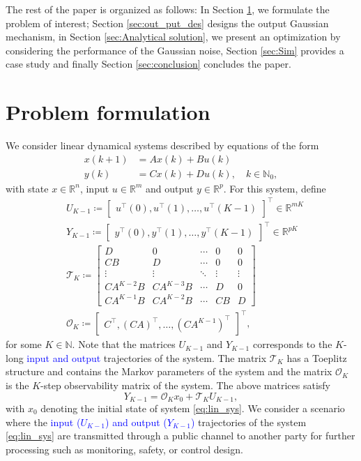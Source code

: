 \documentclass{ifacconf}
\newcommand{\calO}{\ensuremath{\mathcal{O}}}
\newcommand{\calT}{\ensuremath{\mathcal{T}}}
\newcommand{\R}{\ensuremath{\mathbb R}}
\newcommand{\N}{\ensuremath{\mathbb N}}
\def\be{\begin{equation}}
\def\ee{\end{equation}}
\newcommand{\bbm}{\begin{bmatrix}}
\newcommand{\ebm}{\end{bmatrix}}
\newcommand{\+}{\mathsmaller{+}}
\newcommand{\blue}[1]{\textcolor{blue}{#1}}
\begin{document}
\par The rest of the paper is organized as follows: In Section \ref{sec:prob_form}, we formulate the problem of interest; Section \ref{sec:out_put_des} designs the output Gaussian mechanism, in Section \ref{sec:Analytical solution}, we present an optimization by considering the performance of the Gaussian noise, Section \ref{sec:Sim} provides a case study and finally Section \ref{sec:conclusion} concludes the paper. 
\section{Problem formulation}\label{sec:prob_form}
We consider linear dynamical systems described by equations of the form
\be\label{eq:lin_sys}
\begin{aligned}
 x(k+1) &= Ax(k) + Bu(k) \\ y(k) &= Cx(k) + Du(k), \quad k \in \N_{0}, 
\end{aligned}
\ee
with state $x \in \R^{n}$, input $u \in \R^{m}$ and output $y \in \R^{p}$.
For this system, define 
\begin{equation*}
\begin{aligned}
	&U_{K-1} \coloneqq \bbm u^\top(0), u^\top(1), \ldots, u^\top(K-1) \ebm^\top \in \R^{mK}\\
 &Y_{K-1} \coloneqq \bbm y^\top(0), y^\top(1), \ldots, y^\top(K-1) \ebm^\top \in \R^{pK}\\
	& \calT_K \coloneqq \bbm
	D & 0 & \cdots & 0 & 0 \\
	C B & D & \cdots & 0 & 0 \\
	\vdots & \vdots & \ddots & \vdots & \vdots \\
	C A^{K-2} B &C A^{K-3}B & \cdots & D &  0 \\
	C A^{K-1} B & C A^{K-2} B & \cdots & C B & D
	\ebm \\
	& \calO_K \coloneqq \bbm C^\top, (CA)^\top, \ldots, (CA^{K-1})^\top \ebm^\top,
\end{aligned}
\end{equation*}
for some $K \in \N$.
Note that the matrices $U_{K-1}$ and $Y_{K-1}$ corresponds to the $K$-long \blue{input and output} trajectories of the system. The matrix $\mathcal{T}_K$ has a Toeplitz structure and contains the Markov parameters of the system and the matrix $\calO_K$ is the $K$-step observability matrix of the system. The above matrices satisfy
%
\be\label{eq:data_eq}
Y_{K-1} = \calO_K x_0 + \calT_{K}U_{K-1},
\ee
with $x_0$ denoting the initial state of system  \eqref{eq:lin_sys}.
We consider a scenario where the \blue{input ($U_{K-1}$) and output ($Y_{K-1}$)} trajectories of the system \eqref{eq:lin_sys} are transmitted through a public channel to another party for further processing such as monitoring, safety, or control design.
\end{document}

